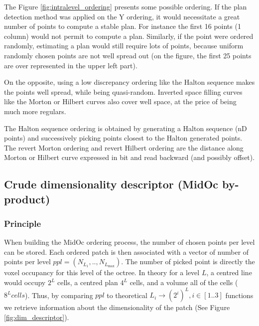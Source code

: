 		The Figure \ref{fig:intralevel_ordering} presents some possible ordering. 
		If the plan detection method was applied on the Y ordering, it would necessitate a great number of points to compute a stable plan. For instance the first 16 points (1 column) would not permit to compute a plan.
		Similarly, if the point were ordered randomly, estimating a plan would still require lots of points, because uniform randomly chosen points are not well spread out (on the figure, the first 25 points are over represented in the upper left part).
		
		On the opposite, using a low discrepancy ordering like the Halton sequence makes the points well spread, while being quasi-random.
		Inverted space filling curves like the Morton or Hilbert curves also cover well space, at the price of being much more regulars.
		
		The Halton sequence ordering is obtained by generating a Halton sequence (nD points) and successively picking points closest to the Halton generated points.
		The revert Morton ordering and revert Hilbert ordering are the distance along Morton or Hilbert curve expressed in bit and read backward (and possibly offset).
		

	\subsection{Crude dimensionality descriptor (MidOc by-product)} 
		\label{method.dimdescriptor}
		\subsubsection{Principle}
		When building the MidOc ordering process, the number of chosen points per level can be stored.
		Each ordered patch is then associated with a vector of number of points per level $ppl=(N_{L_{1}},..,N_{L_{\text{max}}})$.
		The number of picked point is directly the voxel occupancy for this level of the octree.
		In theory for a level $L$, a centred line would occupy $2^L$ cells, a centred plan $4^L$ cells, and a volume all of the cells ($8^L cells$).
		Thus, by comparing $ppl$ to theoretical $L_i  \rightarrow (2^i)^L,i \in [1..3]$ functions we retrieve information about the dimensionality of the patch (See Figure \ref{fig:dim_descriptor}). 
		
